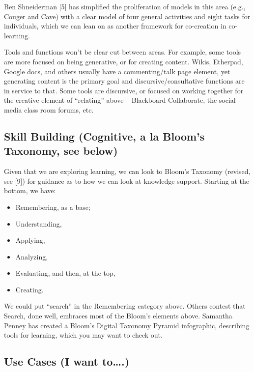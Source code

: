 Ben Shneiderman {{[}5{]}} has simplified the proliferation of models in
this area (e.g., Couger and Cave) with a clear model of four general
activities and eight tasks for individuals, which we can lean on as
another framework for co-creation in co-learning.

Tools and functions won't be clear cut between areas. For example, some
tools are more focused on being generative, or for creating content.
Wikis, Etherpad, Google docs, and others usually have a commenting/talk
page element, yet generating content is the primary goal and
discursive/consultative functions are in service to that. Some tools are
discursive, or focused on working together for the creative element of
``relating'' above -- Blackboard Collaborate, the social media class
room forums, etc.

\hypertarget{skill-building-cognitive-a-la-blooms-taxonomy-see-below}{%
\subsection{Skill Building (Cognitive, a la Bloom's Taxonomy, see
below)}\label{skill-building-cognitive-a-la-blooms-taxonomy-see-below}}

Given that we are exploring learning, we can look to Bloom's Taxonomy
(revised, see {{[}9{]}}) for guidance as to how we can look at knowledge
support. Starting at the bottom, we have:

\begin{itemize}
\tightlist
\item
  Remembering, as a base;
\item
  Understanding,
\item
  Applying,
\item
  Analyzing,
\item
  Evaluating, and then, at the top,
\item
  Creating.
\end{itemize}

We could put ``search'' in the Remembering category above. Others
contest that Search, done well, embraces most of the Bloom's elements
above. Samantha Penney has created a
\href{http://www.usi.edu/distance/bdt.htm}{Bloom's Digital Taxonomy
Pyramid} infographic, describing tools for learning, which you may want
to check out.

\hypertarget{use-cases-i-want-to.}{%
\subsection{Use Cases (I want
to\ldots.)}\label{use-cases-i-want-to.}}

